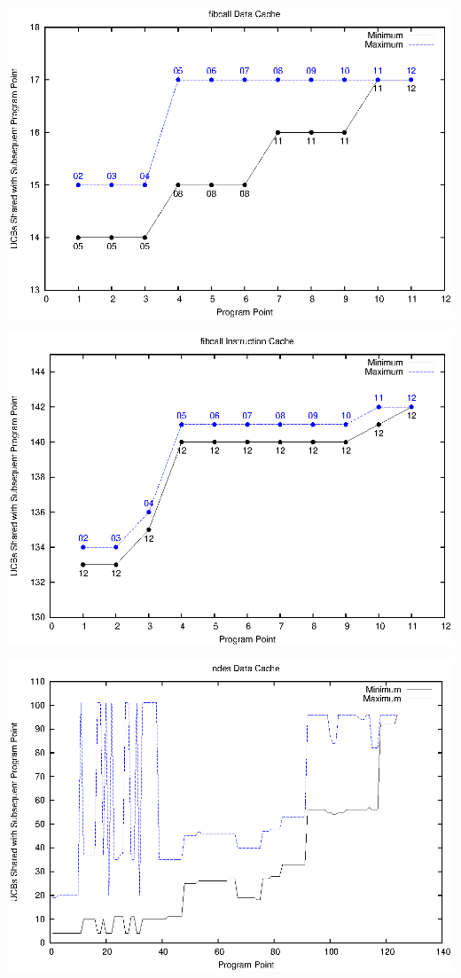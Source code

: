 \begin{center}
  \includegraphics[width=\linewidth]{eps/fibcall-dcache.eps}
\end{center}

\begin{center}
  \includegraphics[width=\linewidth]{eps/fibcall-icache.eps}
\end{center}

\begin{center}
  \includegraphics[width=\linewidth]{eps/ndes-dcache.eps}
\end{center}

